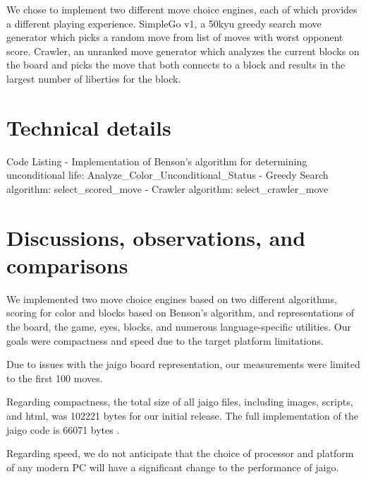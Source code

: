 \documentclass{memoir}
\begin{document}
We chose to implement two different move choice engines, each of which provides a different playing experience. SimpleGo v1, a 50kyu greedy search move generator which picks a random move from list of moves with worst opponent score. Crawler, an unranked move generator which analyzes the current blocks on the board and picks the move that both connects to a block and results in the largest number of liberties for the block.

\chapter{Technical details}
Code Listing
- Implementation of Benson's algorithm for determining unconditional life: Analyze\_Color\_Unconditional\_Status
- Greedy Search algorithm: select\_scored\_move
- Crawler algorithm: select\_crawler\_move

\chapter{Discussions, observations, and comparisons}
We implemented two move choice engines based on two different algorithms, scoring for color and blocks based on Benson's algorithm, and representations of the board, the game, eyes, blocks, and numerous language-specific utilities. Our goals were compactness and speed due to the target platform limitations. 

Due to issues with the jaigo board representation, our measurements were limited to the first 100 moves.

Regarding compactness, the total size of all jaigo files, including images, scripts, and html, was 102221 bytes for our initial release. The full implementation of the jaigo code is 66071 bytes \cite{SpeedReport}.

Regarding speed, we do not anticipate that the choice of processor and platform of any modern PC will have a significant change to the performance of jaigo.
\end{document}
